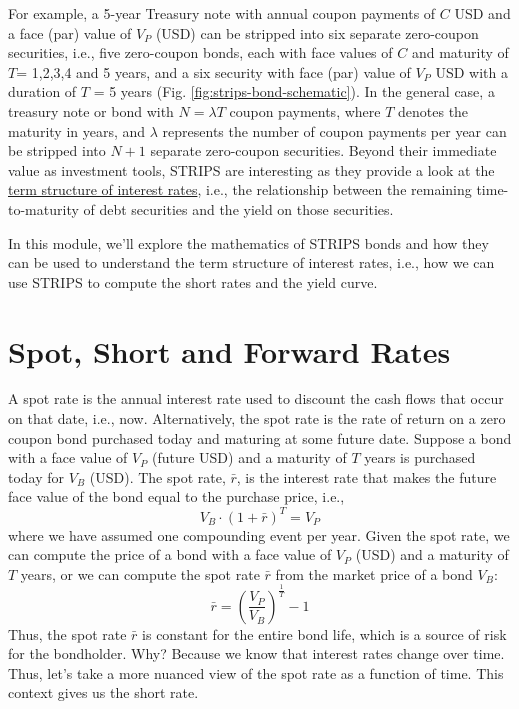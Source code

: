 \documentclass[11pt]{article}
\theoremstyle{definition}
\begin{document}
For example, a 5-year Treasury note with annual coupon payments of $C$ USD and a face (par) value of $V_{P}$ (USD)
can be stripped into six separate zero-coupon securities, i.e., five zero-coupon bonds, each with face values of $C$ 
and maturity of $T$= 1,2,3,4 and 5 years, and a six security with face  (par) value of $V_{P}$ USD with a duration of $T$ = 5 years (Fig. \ref{fig:strips-bond-schematic}). 
In the general case, a treasury note or bond with $N=\lambda{T}$ coupon payments, where $T$ denotes the maturity in years, and $\lambda$ represents 
the number of coupon payments per year can be stripped into $N+1$ separate zero-coupon securities.
Beyond their immediate value as investment tools, STRIPS are interesting as they provide a look at the 
\href{https://www.federalreserve.gov/data/yield-curve-models.htm}{term structure of interest rates}, i.e., the relationship between the remaining time-to-maturity of debt securities 
and the yield on those securities.

In this module, we'll explore the mathematics of STRIPS bonds and how they can be used to understand the term structure of interest rates, i.e., how we can use STRIPS to compute the short rates and the yield curve.

\section*{Spot, Short and Forward Rates}
A spot rate is the annual interest rate used to discount the cash flows that occur on that date, i.e., now. Alternatively, the spot rate is the rate of return on a zero coupon bond purchased today and maturing at some future date. Suppose a bond with a face value of $V_{P}$ (future USD) and a maturity of $T$ years is purchased today for $V_{B}$ (USD). The spot rate, $\bar{r}$, is the interest rate that makes the future face value of the bond equal to the purchase price, i.e.,
\begin{equation}
V_{B}\cdot(1+\bar{r})^{T} = V_{P}
\end{equation}
where we have assumed one compounding event per year. Given the spot rate, we can compute the price of a bond with a face value of $V_{P}$ (USD) and a maturity of $T$ years, or we can compute the spot rate $\bar{r}$ from the market price of a bond $V_{B}$:
\begin{equation}
\bar{r} = \left(\frac{V_{P}}{V_{B}}\right)^{\frac{1}{T}}-1
\end{equation}
Thus, the spot rate $\bar{r}$ is constant for the entire bond life, which is a source of risk for the bondholder.
Why? Because we know that interest rates change over time. Thus, let's take a more nuanced view of the spot rate as a function of time. This context gives us the short rate.
\end{document}
